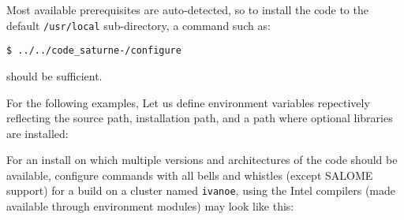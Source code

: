\documentclass[a4paper,10pt,twoside]{csshortdoc}
\begin{document}
Most available prerequisites are auto-detected, so to install the
code to the default \texttt{/usr/local} sub-directory,
a command such as:

\texttt{\$ ../../code\_saturne-\verscs/configure}

should be sufficient.

For the following examples, Let us define environment variables repectively
reflecting the \CS source path, installation path, and a path where optional
libraries are installed:


For an install on which multiple
versions and architectures of the code should be available,
configure commands with all bells and whistles (except SALOME support) for a
build on a cluster named \texttt{ivanoe}, using the Intel compilers
(made available through environment modules) may look like this:
\end{document}
